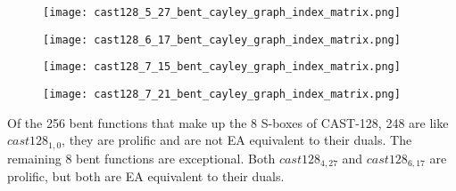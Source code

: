 \begin{figure}[!ht]
\centering
\begin{minipage}{.48\textwidth}
  \centering
\texttt{[image: cast128\_5\_27\_bent\_cayley\_graph\_index\_matrix.png]}
  \label{fig:cast128_5_27_bent_cayley_graph_index_matrix}
\end{minipage}%
\begin{minipage}{.48\textwidth}
  \centering
\texttt{[image: cast128\_6\_17\_bent\_cayley\_graph\_index\_matrix.png]}
  \label{fig:cast128_6_17_bent_cayley_graph_index_matrix}
\end{minipage}%
\end{figure}
\begin{figure}[!ht]
\centering
\begin{minipage}{.48\textwidth}
  \centering
\texttt{[image: cast128\_7\_15\_bent\_cayley\_graph\_index\_matrix.png]}
  \label{fig:cast128_7_15_bent_cayley_graph_index_matrix}
\end{minipage}%
\begin{minipage}{.48\textwidth}
  \centering
\texttt{[image: cast128\_7\_21\_bent\_cayley\_graph\_index\_matrix.png]}
  \label{fig:cast128_7_21_bent_cayley_graph_index_matrix}
\end{minipage}%
\end{figure}

Of the 256 bent functions that make up the 8 S-boxes of CAST-128, 248 are like $cast128_{1,0}$,
they are prolific and are not EA equivalent to their duals.
The remaining 8 bent functions are exceptional.
Both $cast128_{4,27}$ and $cast128_{6,17}$ are prolific, but both are EA equivalent to their duals.
\newpage

